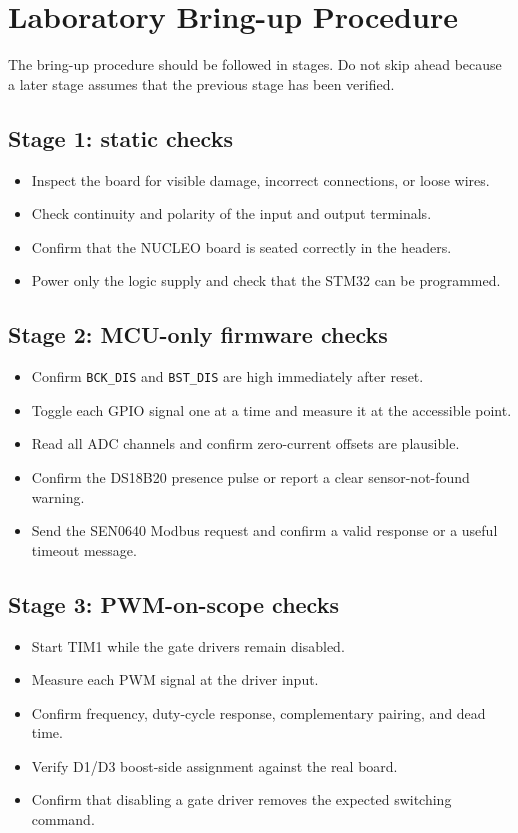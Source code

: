 \documentclass[11pt,a4paper]{article}
\newcommand{\code}[1]{\texttt{#1}}
\let\originalsection\section
\renewcommand{\section}{\clearpage\originalsection}
\begin{document}
\section{Laboratory Bring-up Procedure}

The bring-up procedure should be followed in stages. Do not skip ahead because a later stage assumes that the previous stage has been verified.

\subsection{Stage 1: static checks}

\begin{itemize}
  \item Inspect the board for visible damage, incorrect connections, or loose wires.
  \item Check continuity and polarity of the input and output terminals.
  \item Confirm that the NUCLEO board is seated correctly in the headers.
  \item Power only the logic supply and check that the STM32 can be programmed.
\end{itemize}

\subsection{Stage 2: MCU-only firmware checks}

\begin{itemize}
  \item Confirm \code{BCK\_DIS} and \code{BST\_DIS} are high immediately after reset.
  \item Toggle each GPIO signal one at a time and measure it at the accessible point.
  \item Read all ADC channels and confirm zero-current offsets are plausible.
  \item Confirm the DS18B20 presence pulse or report a clear sensor-not-found warning.
  \item Send the SEN0640 Modbus request and confirm a valid response or a useful timeout message.
\end{itemize}

\subsection{Stage 3: PWM-on-scope checks}

\begin{itemize}
  \item Start TIM1 while the gate drivers remain disabled.
  \item Measure each PWM signal at the driver input.
  \item Confirm frequency, duty-cycle response, complementary pairing, and dead time.
  \item Verify D1/D3 boost-side assignment against the real board.
  \item Confirm that disabling a gate driver removes the expected switching command.
\end{itemize}
\end{document}
